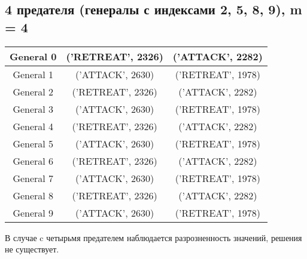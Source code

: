 \documentclass[12pt,a4paper]{article}
\begin{document}
            \subsection{4 предателя (генералы с индексами 2, 5, 8, 9), m = 4}
                \begin{center}
                    \begin{tabular}{|c|c|c|}
                        \hline
                        General 0 & ('RETREAT', 2326) & ('ATTACK', 2282) \\ \hline
                        General 1 & ('ATTACK', 2630)  & ('RETREAT', 1978)\\ \hline
                        General 2 & ('RETREAT', 2326) & ('ATTACK', 2282) \\ \hline
                        General 3 & ('ATTACK', 2630)  & ('RETREAT', 1978)\\ \hline
                        General 4 & ('RETREAT', 2326) & ('ATTACK', 2282) \\ \hline
                        General 5 & ('ATTACK', 2630)  & ('RETREAT', 1978)\\ \hline
                        General 6 & ('RETREAT', 2326) & ('ATTACK', 2282) \\ \hline
                        General 7 & ('ATTACK', 2630)  & ('RETREAT', 1978)\\ \hline
                        General 8 & ('RETREAT', 2326) & ('ATTACK', 2282) \\ \hline
                        General 9 & ('ATTACK', 2630)  & ('RETREAT', 1978)\\ \hline
                    \end{tabular}
            \end{center}
            В случае c четырьмя предателем наблюдается разрозненность значений, решения не существует.
            
        \clearpage
	\newpage
\end{document}
